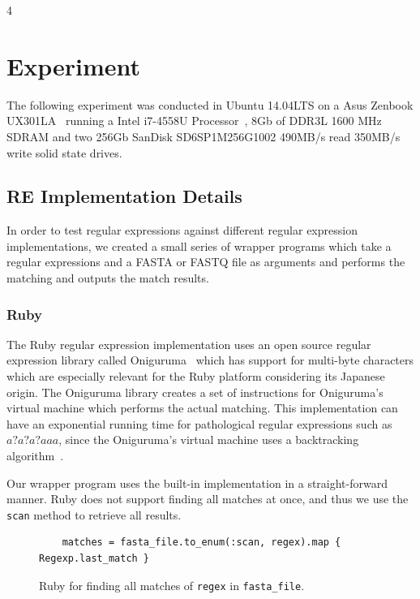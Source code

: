 \documentclass[12pt]{article}
\theoremstyle{definition}
\begin{document}
\newpage

4\section{Experiment}

The following experiment was conducted in Ubuntu 14.04LTS on a Asus Zenbook UX301LA~\cite{computer} running a Intel i7-4558U Processor~\cite{processor}, 8Gb of DDR3L 1600 MHz SDRAM and two 256Gb SanDisk SD6SP1M256G1002 490MB/s read 350MB/s write solid state drives.

\subsection{RE Implementation Details}

In order to test regular expressions against different regular expression implementations, we created a small series of wrapper programs which take a regular expressions and a FASTA or FASTQ file as arguments and performs the matching and outputs the match results.

\subsubsection{Ruby}

The Ruby regular expression implementation uses an open source regular expression library called Oniguruma~\cite{oniguruma} which has support for multi-byte characters which are especially relevant for the Ruby platform considering its Japanese origin. The Oniguruma library creates a set of instructions for Oniguruma's virtual machine which performs the actual matching. This implementation can have an exponential running time for pathological regular expressions such as $a?a?a?aaa$, since the Oniguruma's virtual machine uses a backtracking algorithm~\cite{oniguruma-overview}.

Our wrapper program uses the built-in implementation in a straight-forward manner. Ruby does not support finding all matches at once, and thus we use the \texttt{scan} method to retrieve all results.

\begin{figure}[H]
	\begin{lstlisting}
	matches = fasta_file.to_enum(:scan, regex).map { Regexp.last_match }
	\end{lstlisting}
	\caption{Ruby for finding all matches of \texttt{regex} in \texttt{fasta\_file}.}
\end{figure}
\end{document}
